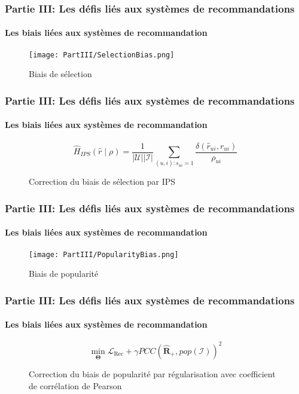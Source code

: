 \begin{frame}

    \frametitle{Partie III: Les défis liés aux systèmes de recommandations}
    \framesubtitle{Les biais liées aux systèmes de recommandation}

    \begin{figure}
        \centering
        \texttt{[image: PartIII/SelectionBias.png]}
        \caption{Biais de sélection}
    \end{figure}

\end{frame}

\begin{frame}

    \frametitle{Partie III: Les défis liés aux systèmes de recommandations}
    \framesubtitle{Les biais liées aux systèmes de recommandation}

    \begin{figure}
        \begin{equation*}
            \hat{H}_{I P S}(\hat{r} \mid \rho)=\frac{1}{|\mathcal{U}||\mathcal{I}|} \sum_{(u, i): s_{u i}=1} \frac{\delta\left(\hat{r}_{u i}, r_{u i}\right)}{\rho_{u i}}
        \end{equation*}
        \caption{Correction du biais de sélection par IPS}
    \end{figure}

\end{frame}

\begin{frame}

    \frametitle{Partie III: Les défis liés aux systèmes de recommandations}
    \framesubtitle{Les biais liées aux systèmes de recommandation}

    \begin{figure}
        \centering
        \texttt{[image: PartIII/PopularityBias.png]}
        \caption{Biais de popularité}
    \end{figure}

\end{frame}

\begin{frame}

    \frametitle{Partie III: Les défis liés aux systèmes de recommandations}
    \framesubtitle{Les biais liées aux systèmes de recommandation}

    \begin{figure}
        \begin{equation*}
            \min _{\boldsymbol{\Theta}} \mathcal{L}_{\operatorname{Rec}}+\gamma P C C\left(\widehat{\mathbf{R}}_{+}, p o p(\mathcal{I})\right)^2
        \end{equation*}
        \caption{Correction du biais de popularité par régularisation avec coefficient de corrélation de Pearson}
    \end{figure}

\end{frame}

